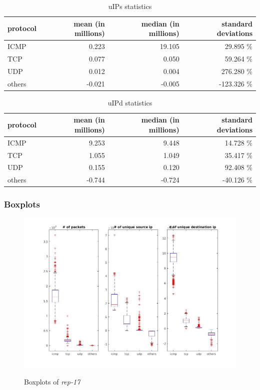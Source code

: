 \begin{table}[H]
\center
\begin{tabular}{lrrr}
\toprule
protocol & mean (in millions) & median (in millions) & standard deviations \\
\midrule
ICMP &    0.223 & 19.105 &   29.895 \% \\
TCP &     0.077 &  0.050 &   59.264 \% \\
UDP &     0.012 &  0.004 &  276.280 \% \\
others & -0.021 & -0.005 & -123.326 \% \\
\bottomrule
\end{tabular}
\caption{ uIPs statistics }
\label{tab:proto-stats-uIPs}
\end{table}

\begin{table}[H]
\center
\begin{tabular}{lrrr}
\toprule
protocol & mean (in millions) & median (in millions) & standard deviations \\
\midrule
ICMP &    9.253 &  9.448 &  14.728 \%  \\
TCP &     1.055 &  1.049 &  35.417 \%  \\
UDP &     0.155 &  0.120 &  92.408 \%  \\
others & -0.744 & -0.724 & -40.126 \%  \\
\bottomrule
\end{tabular}
\caption{ uIPd statistics }
\label{tab:proto-stats-uIPd}
\end{table}

\subsubsection*{Boxplots}
\begin{figure}[H]
\center
\includegraphics[width=.7\textwidth]{./chapters/plots/rep17.jpg}\\
\caption{Boxplots of \textit{rep-17}}
\end{figure}


